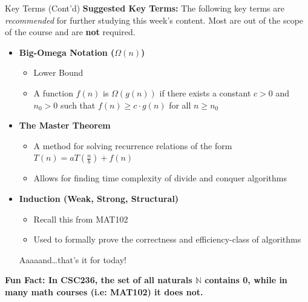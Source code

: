 \documentclass[hyperref={colorlinks,citecolor=blue,linkcolor=blue,urlcolor=blue}, aspectratio=1610]{beamer}
\begin{document}
\begin{frame}{Key Terms (Cont'd)}
  \textbf{Suggested Key Terms:} The following key terms are \textit{recommended} for further studying this week's content. Most are out of the scope of the course and are \textbf{not} required. 
  \begin{itemize} 
    \item \textbf{Big-Omega Notation ($\Omega(n)$)}
    \begin{itemize}
      \item Lower Bound
      \item A function $f(n)$ is $\Omega(g(n))$ if there exists a constant $c > 0$ and $n_0 > 0$ such that $f(n) \geq c \cdot g(n)$ for all $n \geq n_0$
    \end{itemize}
    \pause
    \item \textbf{The Master Theorem}
    \begin{itemize}
      \item A method for solving recurrence relations of the form $T(n) = aT\left(\frac{n}{b}\right) + f(n)$
      \item Allows for finding time complexity of divide and conquer algorithms
    \end{itemize}
    \pause
    \item \textbf{Induction (Weak, Strong, Structural)}
    \begin{itemize}
      \item Recall this from MAT102
      \item Used to formally prove the correctness and efficiency-class of algorithms
    \end{itemize}
    Aaaaand\ldots that's it for today! 
  \end{itemize}

  \textbf{Fun Fact: In CSC236, the set of all naturals $\mathbb{N}$ contains 0, while in many math courses (i.e: MAT102) it does not.}
\end{frame}
\end{document}
